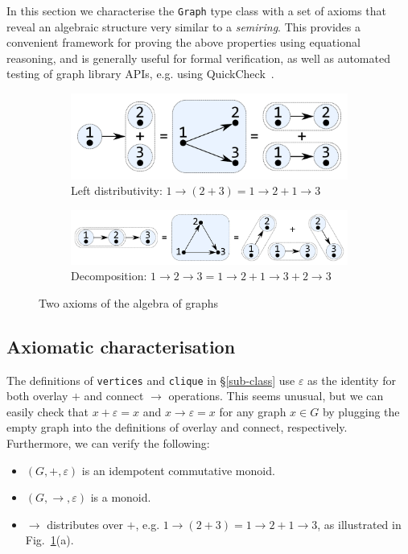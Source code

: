 \documentclass[acmlarge,anonymous]{acmart}\settopmatter{printfolios=true}
\newcommand{\hs}{\texttt}
\begin{document}
In this section we characterise the \hs{Graph} type class with a set of
axioms that reveal an algebraic structure very similar to a \emph{semiring}.
This provides a convenient framework for proving the above properties using equational
reasoning, and is generally useful for formal verification, as well as automated testing
of graph library APIs, e.g. using QuickCheck~\cite{2011_quickcheck_claessen}.

\begin{figure}
\begin{subfigure}[b]{0.4\linewidth}
\centerline{\includegraphics[scale=0.27]{fig/ax-distributivity.pdf}}
\caption{Left distributivity: $1 \rightarrow (2 + 3) = 1 \rightarrow 2 + 1 \rightarrow 3$ }
\end{subfigure}
\hspace{12mm}
\begin{subfigure}[b]{0.5\linewidth}
\centerline{\includegraphics[scale=0.27]{fig/ax-decomposition.pdf}}
\caption{Decomposition: $1 \rightarrow 2 \rightarrow 3 = 1 \rightarrow 2 +
1 \rightarrow 3 + 2 \rightarrow 3$}
\end{subfigure}
\vspace{-1mm}
\caption{Two axioms of the algebra of graphs\label{fig-axioms}}
\vspace{-3mm}
\end{figure}

\subsection{Axiomatic characterisation}

The definitions of \hs{vertices} and \hs{clique} in \S\ref{sub-class}
use $\varepsilon$ as the identity for both overlay $+$ and connect $\rightarrow$
operations. This seems unusual, but we can easily check that
$x + \varepsilon = x$ and $x \rightarrow \varepsilon = x$ for any graph $x \in G$
by plugging the empty graph into the definitions of overlay and connect,
respectively. Furthermore, we can verify the following:
\begin{itemize}
    \item $(G,+,\varepsilon)$ is an idempotent commutative monoid.
    \item $(G,\rightarrow,\varepsilon)$ is a monoid.
    \item $\rightarrow$ distributes over $+$, e.g.
    $1 \rightarrow (2 + 3) = 1 \rightarrow 2 + 1 \rightarrow 3$, as illustrated
    in Fig.~\ref{fig-axioms}(a).
\end{itemize}
\end{document}
